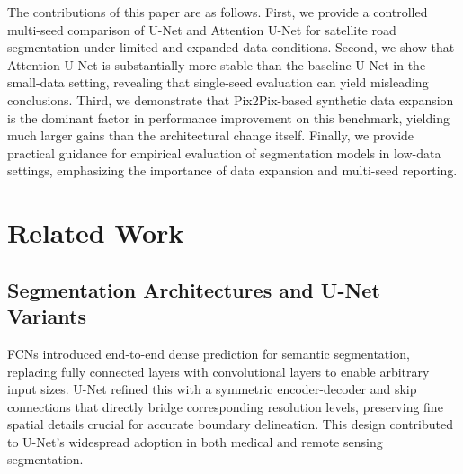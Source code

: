 \documentclass[conference]{IEEEtran}
\begin{document}

The contributions of this paper are as follows. First, we provide a controlled multi-seed comparison of U-Net and Attention U-Net for satellite road segmentation under limited and expanded data conditions. Second, we show that Attention U-Net is substantially more stable than the baseline U-Net in the small-data setting, revealing that single-seed evaluation can yield misleading conclusions. Third, we demonstrate that Pix2Pix-based synthetic data expansion is the dominant factor in performance improvement on this benchmark, yielding much larger gains than the architectural change itself. Finally, we provide practical guidance for empirical evaluation of segmentation models in low-data settings, emphasizing the importance of data expansion and multi-seed reporting.

\section{Related Work}
\label{sec:related_work}

\subsection{Segmentation Architectures and U-Net Variants}

FCNs \cite{b4} introduced end-to-end dense prediction for semantic segmentation, replacing fully connected layers with convolutional layers to enable arbitrary input sizes. U-Net \cite{b1} refined this with a symmetric encoder-decoder and skip connections that directly bridge corresponding resolution levels, preserving fine spatial details crucial for accurate boundary delineation. %
This design contributed to U-Net’s widespread adoption in both medical and remote sensing segmentation.
\end{document}
